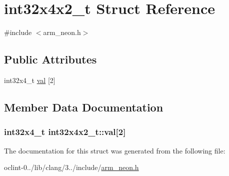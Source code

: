 \hypertarget{structint32x4x2__t}{\section{int32x4x2\-\_\-t Struct Reference}
\label{structint32x4x2__t}
}


{\ttfamily \#include $<$arm\-\_\-neon.\-h$>$}

\subsection*{Public Attributes}
\begin{DoxyCompactItemize}
\item 
int32x4\-\_\-t \hyperlink{structint32x4x2__t_a2dde21a3c94e94d2e56ab04a0a05f105}{val} \mbox{[}2\mbox{]}
\end{DoxyCompactItemize}


\subsection{Member Data Documentation}
\hypertarget{structint32x4x2__t_a2dde21a3c94e94d2e56ab04a0a05f105}{
\subsubsection[{val}]{\setlength{\rightskip}{0pt plus 5cm}int32x4\-\_\-t int32x4x2\-\_\-t\-::val\mbox{[}2\mbox{]}}}\label{structint32x4x2__t_a2dde21a3c94e94d2e56ab04a0a05f105}


The documentation for this struct was generated from the following file\-:\begin{DoxyCompactItemize}
\item 
oclint-\/0../lib/clang/3../include/\hyperlink{arm__neon_8h}{arm\-\_\-neon.\-h}\end{DoxyCompactItemize}

